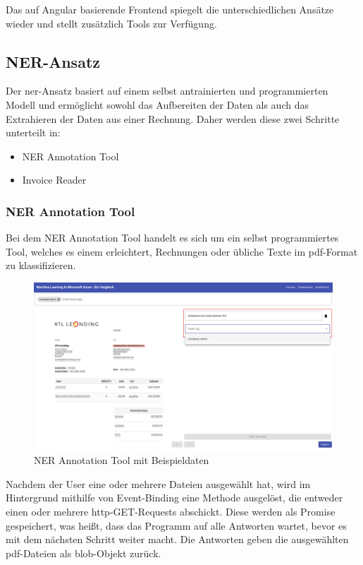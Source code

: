 Das auf Angular basierende Frontend spiegelt die unterschiedlichen Ansätze wieder und stellt zusätzlich Tools zur Verfügung.

\subsection{NER-Ansatz}

Der \gls{ner}-Ansatz basiert auf einem selbst antrainierten und programmierten Modell und ermöglicht sowohl das Aufbereiten der Daten als auch das Extrahieren der Daten aus einer Rechnung. Daher werden diese zwei Schritte unterteilt in: 

\begin{itemize}
    \item NER Annotation Tool
    \item Invoice Reader
\end{itemize}

\subsubsection{NER Annotation Tool}

Bei dem NER Annotation Tool handelt es sich um ein selbst programmiertes Tool, welches es einem erleichtert, Rechnungen oder übliche Texte im pdf-Format zu klassifizieren. 

\begin{figure}[H]
    \centering
    \includegraphics[scale=0.25]{sections/implementation/images/NERAnotationTool.png}
    \caption{NER Annotation Tool mit Beispieldaten}
\end{figure}

Nachdem der User eine oder mehrere Dateien ausgewählt hat, wird im Hintergrund mithilfe von Event-Binding eine Methode ausgelöst, die entweder einen oder mehrere \gls{http}-GET-Requests abschickt. Diese werden als Promise gespeichert, was heißt, dass das Programm auf alle Antworten wartet, bevor es mit dem nächsten Schritt weiter macht. Die Antworten geben die ausgewählten pdf-Dateien als blob-Objekt zurück.

